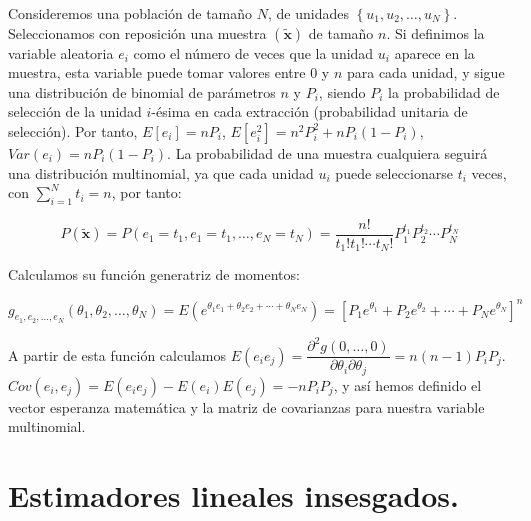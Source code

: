 Consideremos una poblaci\'on de tama\~no $N$, de unidades $\left\{ u_{1},u_{2},\ldots,u_{N}\right\} $.
Seleccionamos con reposici\'on una muestra $\left(\widetilde{\boldsymbol{x}}\right)$
de tama\~no $n$. Si definimos la variable aleatoria $e_{i}$ como el
n\'umero de veces que la unidad $u_{i}$ aparece en la muestra, esta
variable puede tomar valores entre $0$ y $n$ para cada unidad, y
sigue una distribuci\'on de binomial de par\'ametros $n$ y $P_{i}$,
siendo $P_{i}$ la probabilidad de selecci\'on de la unidad $i$-\'esima
en cada extracci\'on (probabilidad unitaria de selecci\'on). Por tanto,
$E\left[e_{i}\right]=nP_{i}$, $E\left[e_{i}^{2}\right]=n^{2}P_{i}^{2}+nP_{i}\left(1-P_{i}\right)$,
$Var\left(e_{i}\right)=nP_{i}\left(1-P_{i}\right)$. La probabilidad
de una muestra cualquiera seguir\'a una distribuci\'on multinomial, ya
que cada unidad $u_{i}$ puede seleccionarse $t_{i}$ veces, con $\sum_{i=1}^{N}t_{i}=n$,
por tanto:

\[
P\left(\widetilde{\boldsymbol{x}}\right)=P\left(e_{1}=t_{1},e_{1}=t_{1},\ldots,e_{N}=t_{N}\right)=\dfrac{n!}{t_{1}!t_{1}!\cdots t_{N}!}P_{1}^{t_{1}}P_{2}^{t_{2}}\cdots P_{N}^{t_{N}}
\]


Calculamos su funci\'on generatriz de momentos:

\[
g_{e_{1},e_{2},\ldots,e_{N}}\left(\theta_{1},\theta_{2},\ldots,\theta_{N}\right)=E\left(e^{\theta_{1}e_{1}+\theta_{2}e_{2}+\cdots+\theta_{N}e_{N}}\right)=\left[P_{1}e^{\theta_{1}}+P_{2}e^{\theta_{2}}+\cdots+P_{N}e^{\theta_{N}}\right]^{n}
\]


A partir de esta funci\'on calculamos $E\left(e_{i}e_{j}\right)=\dfrac{\partial^{2}g\left(0,\ldots,0\right)}{\partial\theta_{i}\partial\theta_{j}}=n\left(n-1\right)P_{i}P_{j}$.
$Cov\left(e_{i},e_{j}\right)=E\left(e_{i}e_{j}\right)-E\left(e_{i}\right)E\left(e_{j}\right)=-nP_{i}P_{j}$,
y as\'i hemos definido el vector esperanza matem\'atica y la matriz de
covarianzas para nuestra variable multinomial.


\section{Estimadores lineales insesgados.}

